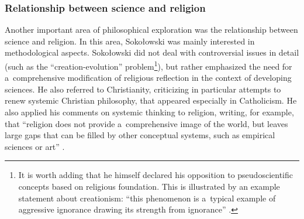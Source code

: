 \documentclass[%
  manuscript=article,
  year=2024,
  volume=77,
  doi=00000.000,
]{zfn}
\begin{document}
\subsubsection{Relationship between science and religion}



Another important area of philosophical exploration was the relationship between science and religion. In this area, Sokołowski was mainly interested in methodological aspects. Sokołowski did not deal with controversial issues in detail (such as the ``creation-evolution'' problem\footnote{It is worth adding that he himself declared his opposition to pseudoscientific concepts based on religious foundation. This is illustrated by an example statement about creationism: ``this phenomenon is a~typical example of aggressive ignorance drawing its strength from ignorance'' 
\parencite[][pp.259–260]{Sokoowski1991Posowie}.%
}), but rather emphasized the need for a~comprehensive modification of religious reflection in the context of developing sciences. He also referred to Christianity, criticizing in particular attempts to renew systemic Christian philosophy, that appeared especially in Catholicism. He also applied his comments on systemic thinking to religion, writing, for example, that ``religion does not provide a~comprehensive image of the world, but leaves large gaps that can be filled by other conceptual systems, such as empirical sciences or art''
\parencite[][p.199]{Sokoowski1989Gos}.%
\end{document}
